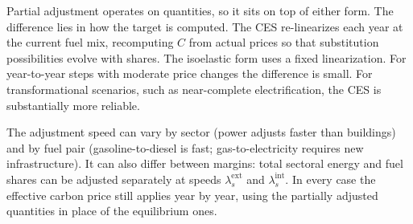 \documentclass[11pt,a4paper]{article}
\begin{document}
Partial adjustment operates on quantities, so it sits on top of either form. The difference lies in how the target is computed. The CES re-linearizes each year at the current fuel mix, recomputing $C$ from actual prices so that substitution possibilities evolve with shares. The isoelastic form uses a fixed linearization. For year-to-year steps with moderate price changes the difference is small. For transformational scenarios, such as near-complete electrification, the CES is substantially more reliable.

The adjustment speed can vary by sector (power adjusts faster than buildings) and by fuel pair (gasoline-to-diesel is fast; gas-to-electricity requires new infrastructure). It can also differ between margins: total sectoral energy and fuel shares can be adjusted separately at speeds $\lambda^{\mathrm{ext}}_s$ and $\lambda^{\mathrm{int}}_s$. In every case the effective carbon price still applies year by year, using the partially adjusted quantities in place of the equilibrium ones.
\end{document}
